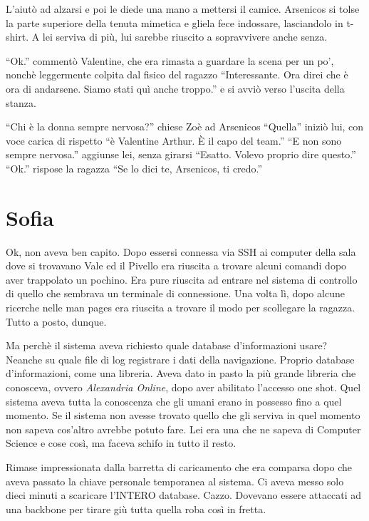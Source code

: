     L'aiutò ad alzarsi e poi le diede una mano a mettersi il camice. Arsenicos si tolse la parte superiore della tenuta
    mimetica e gliela fece indossare, lasciandolo in t-shirt. A lei serviva di più, lui sarebbe riuscito a sopravvivere
    anche senza.

    ``Ok.'' commentò Valentine, che era rimasta a guardare la scena per un po', nonchè leggermente colpita dal fisico
    del ragazzo ``Interessante. Ora direi che è ora di andarsene. Siamo stati quì anche troppo.'' e si avviò verso
    l'uscita della stanza.

    ``Chi è la donna sempre nervosa?'' chiese Zoè ad Arsenicos ``Quella'' iniziò lui, con voce carica di rispetto ``è
    Valentine Arthur. È il capo del team.'' ``E non sono sempre nervosa.'' aggiunse lei, senza girarsi ``Esatto. Volevo
    proprio dire questo.'' ``Ok.'' rispose la ragazza ``Se lo dici te, Arsenicos, ti credo.''

  \section*{Sofia}

    Ok, non aveva ben capito. Dopo essersi connessa via SSH ai computer della sala dove si trovavano Vale ed il Pivello
    era riuscita a trovare alcuni comandi dopo aver trappolato un pochino. Era pure riuscita ad entrare nel sistema di
    controllo di quello che sembrava un terminale di connessione. Una volta lì, dopo alcune ricerche nelle man pages era
    riuscita a trovare il modo per scollegare la ragazza. Tutto a posto, dunque.

    Ma perchè il sistema aveva richiesto quale database d'informazioni usare? Neanche su quale file di log registrare i
    dati della navigazione. Proprio database d'informazioni, come una libreria. Aveva dato in pasto la più grande
    libreria che conosceva, ovvero \emph{Alexandria Online}, dopo aver abilitato l'accesso one shot. Quel sistema aveva
    tutta la conoscenza che gli umani erano in possesso fino a quel momento. Se il sistema non avesse trovato quello che
    gli serviva in quel momento non sapeva cos'altro avrebbe potuto fare. Lei era una che ne sapeva di Computer Science
    e cose così, ma faceva schifo in tutto il resto.

    Rimase impressionata dalla barretta di caricamento che era comparsa dopo che aveva passato la chiave personale
    temporanea al sistema. Ci aveva messo solo dieci minuti a scaricare l'INTERO database. Cazzo. Dovevano essere
    attaccati ad una backbone per tirare giù tutta quella roba così in fretta.

